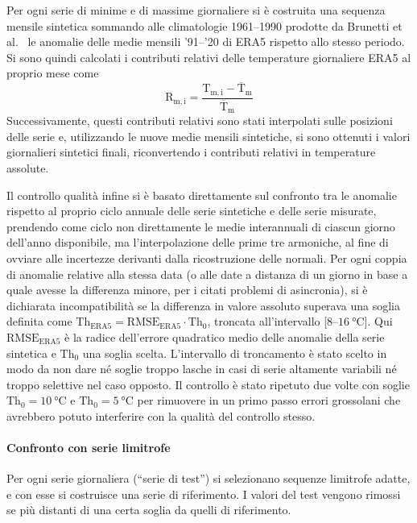 Per ogni serie di minime e di massime giornaliere si è costruita una sequenza mensile sintetica sommando alle climatologie 1961--1990 prodotte da Brunetti et al.~\cite{brunettiHighresolutionTemperatureClimatology2014} le anomalie delle medie mensili '91--'20 di ERA5 rispetto allo stesso periodo. Si sono quindi calcolati i contributi relativi delle temperature giornaliere ERA5 al proprio mese come
\[\mathrm{R_{m,i}} = \frac{\mathrm{T_{m,i}} - \mathrm{\overline{T}_m}}{\mathrm{\overline{T}_m}}\]
Successivamente, questi contributi relativi sono stati interpolati sulle posizioni delle serie e, utilizzando le nuove medie mensili sintetiche, si sono ottenuti i valori giornalieri sintetici finali, riconvertendo i contributi relativi in temperature assolute.

Il controllo qualità infine si è basato direttamente sul confronto tra le anomalie rispetto al proprio ciclo annuale delle serie sintetiche e delle serie misurate, prendendo come ciclo non direttamente le medie interannuali di ciascun giorno dell'anno disponibile, ma l'interpolazione delle prime tre armoniche, al fine di ovviare alle incertezze derivanti dalla ricostruzione delle normali. Per ogni coppia di anomalie relative alla stessa data (o alle date a distanza di un giorno in base a quale avesse la differenza minore, per i citati problemi di asincronia), si è dichiarata incompatibilità se la differenza in valore assoluto superava una soglia definita come \(\mathrm{Th_{ERA5}} = \mathrm{RMSE_{ERA5}}\cdot\mathrm{Th_0}\), troncata all'intervallo [\(\num{8}\)--\(\qty{16}{\degreeCelsius}]\). Qui \(\mathrm{RMSE_{ERA5}}\) è la radice dell'errore quadratico medio delle anomalie della serie sintetica e \(\mathrm{Th_0}\) una soglia scelta. L'intervallo di troncamento è stato scelto in modo da non dare né soglie troppo lasche in casi di serie altamente variabili né troppo selettive nel caso opposto. Il controllo è stato ripetuto due volte con soglie \(\mathrm{Th_0} = \qty{10}{\degreeCelsius}\) e \(\mathrm{Th_0} = \qty{5}{\degreeCelsius}\) per rimuovere in un primo passo errori grossolani che avrebbero potuto interferire con la qualità del controllo stesso.

\paragraph{Confronto con serie limitrofe}\label{ch:close-series}
Per ogni serie giornaliera (``serie di test'') si selezionano sequenze limitrofe adatte, e con esse si costruisce una serie di riferimento. I valori del test vengono rimossi se più distanti di una certa soglia da quelli di riferimento.

